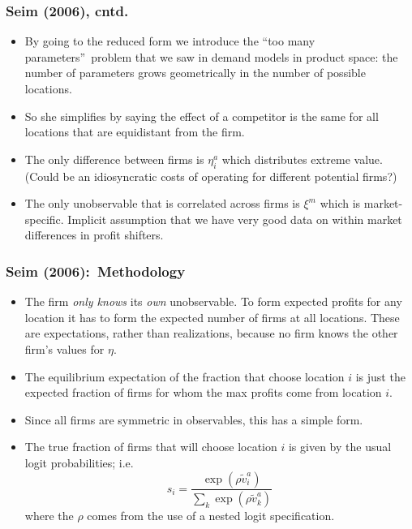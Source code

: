 \begin{frame}
\frametitle{Seim (2006), cntd.}
\footnotesize
\begin{itemize}
\item By going to the reduced form we introduce the \textquotedblleft too
many parameters\textquotedblright\ problem that we saw in demand models in
product space: the number of parameters grows geometrically in the number of
possible locations.

\item So she simplifies by saying the effect of a competitor is the same for
all locations that are equidistant from the firm.

\item The only difference between firms is $\eta _{i}^{a}$ which distributes
extreme value. (Could be an idiosyncratic costs of operating for different
potential firms?)

\item The only unobservable that is correlated across firms is $\xi ^{m}$
which is market-specific. Implicit assumption that we have very good data on
within market differences in profit shifters.
\end{itemize}
\end{frame}

\begin{frame}
\frametitle{Seim (2006):\ Methodology}

\footnotesize
\begin{itemize}
\item The firm \textit{only knows} its \textit{own} unobservable. To form
expected profits for any location it has to form the expected number of
firms at all locations. These are expectations, rather than realizations,
because no firm knows the other firm's values for $\eta $.
\item The equilibrium expectation of the fraction that choose location $i$
is just the expected fraction of firms for whom the max profits come from
location $i.$
\item Since all firms are symmetric in observables, this has a simple form.
\item The true fraction of firms that will choose location $i$ is given by
the usual logit probabilities; i.e. 
\begin{equation*}
s_{i}=\frac{\exp (\rho \tilde{v}_{i}^{a})}{\sum_{k}\exp (\rho \tilde{v}%
_{k}^{a})}
\end{equation*}
where the $\rho $ comes from the use of a nested logit specification.
\end{itemize}
\end{frame}

